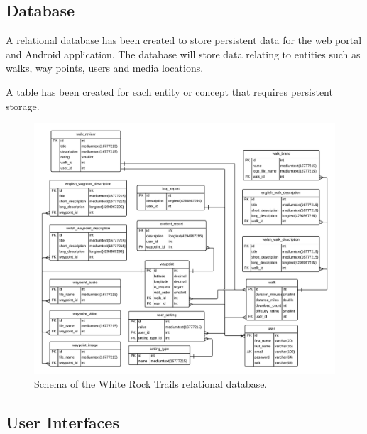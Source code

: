 \documentclass[11pt,a4paper]{article}
\begin{document}
\subsection{Database}

A relational database has been created to store persistent data for the web portal and Android application.
The database will store data relating to entities such as walks, way points, users and media locations.

A table has been created for each entity or concept that requires persistent storage.

\begin{figure}[h!]
\centering
\includegraphics[angle=90, width=1\linewidth]{./img/DatabaseSchema}
\caption{Schema of the White Rock Trails relational database.}
\label{fig:DatabaseSchema}
\end{figure}


\subsection{User Interfaces}
\end{document}

